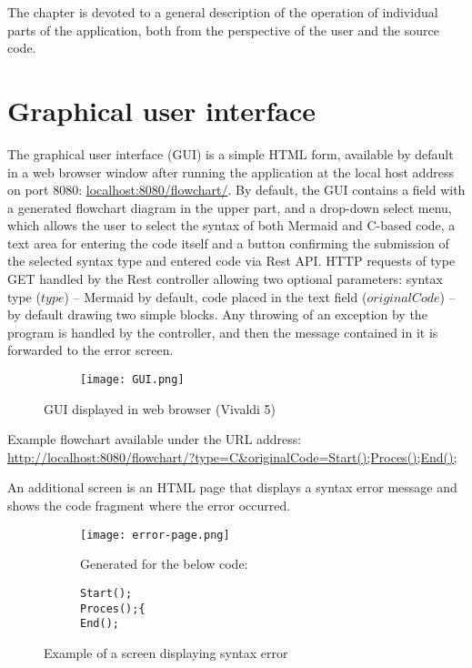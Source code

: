 The chapter is devoted to a general description of the operation of individual parts of the application, both from the perspective of the user and the source code.

\section{Graphical user interface}
  The graphical user interface (GUI) is a simple HTML form, available by default in a web browser window after running the application at the local host address on port 8080: 
	\smallbreak
	\href{http://localhost:8080/flowchart/}{localhost:8080/flowchart/}.
	\bigbreak	
  By default, the GUI contains a field with a generated flowchart diagram in the upper part, and a drop-down select menu, which allows the user to select the syntax of both Mermaid and C-based code, a text area for entering the code itself and a button confirming the submission of the selected syntax type and entered code via Rest API. HTTP requests of type GET handled by the Rest controller allowing two optional parameters: syntax type ($type$) -- Mermaid by default, code placed in the text field ($originalCode$) -- by default drawing two simple blocks. Any throwing of an exception by the program is handled by the controller, and then the message contained in it is forwarded to the error screen.
	
\begin{figure}[H]
  \begin{subfigure}{\textwidth}
    \centering
    \texttt{[image: GUI.png]}
  \end{subfigure}\hfill
  \caption{GUI displayed in web browser (Vivaldi 5)}
\end{figure}

Example flowchart available under the URL address: 
	\smallbreak
	\href{http://localhost:8080/flowchart/?type=C\&originalCode=Start();Proces();End();}{http://localhost:8080/flowchart/?type=C\&originalCode=Start();Proces();End();}
	\bigbreak
	
  An additional screen is an HTML page that displays a syntax error message and shows the code fragment where the error occurred.
	
\begin{figure}[H]
  \begin{subfigure}{\textwidth}
  \centering
    \texttt{[image: error-page.png]}
  \end{subfigure}\hfill
    \begin{subfigure}[t]{0.44\textwidth}
    \bigbreak
    Generated for the below code:
    \centering
    \begin{verbatim}    
Start();
Proces();{
End();
    \end{verbatim}
  \end{subfigure}%
  \caption{Example of a screen displaying syntax error}
\end{figure}


